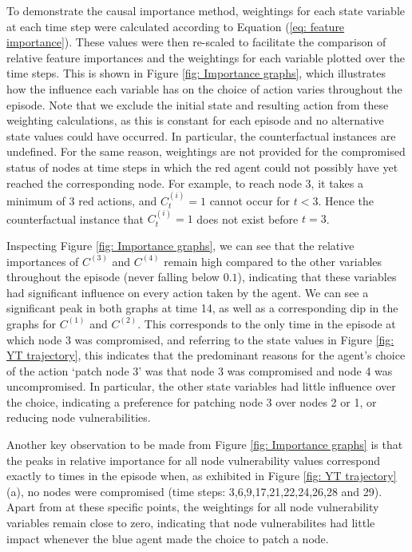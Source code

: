 \documentclass{article}
\begin{document}
To demonstrate the causal importance method, weightings for each state variable at each time step were calculated according to Equation (\ref{eq: feature importance}). 
These values were then re-scaled to facilitate the comparison of relative feature importances and the weightings for each variable plotted over the time steps. This is shown in Figure \ref{fig: Importance graphs}, which illustrates how the influence each variable has on the choice of action varies throughout the episode. Note that we exclude the initial state and resulting action from these weighting calculations, as this is constant for each episode and no alternative state values could have occurred. In particular, the counterfactual instances are undefined. For the same reason, weightings are not provided for the compromised status of nodes at time steps in which the red agent could not possibly have yet reached the corresponding node. For example, to reach node 3, it takes a minimum of 3 red actions, and $C^{(i)}_t = 1$ cannot occur for $t<3$. Hence the counterfactual instance that $C^{(i)}_t = 1$ does not exist before $t=3$. 

Inspecting Figure \ref{fig: Importance graphs}, we can see that the relative importances of $C^{(3)}$ and $C^{(4)}$ remain high compared to the other variables throughout the episode (never falling below $0.1$), indicating that these variables had significant influence on every action taken by the agent. We can see a significant peak in both graphs at time 14, as well as a corresponding dip in the graphs for $C^{(1)}$ and $C^{(2)}$. This corresponds to the only time in the episode at which node 3 was compromised, and referring to the state values in Figure \ref{fig: YT trajectory}, this indicates that the predominant reasons for the agent's choice of the action `patch node 3' was that node 3 was compromised and node 4 was uncompromised. In particular, the other state variables had little influence over the choice, indicating a preference for patching node 3 over nodes 2 or 1, or reducing node vulnerabilities. 

Another key observation to be made from Figure \ref{fig: Importance graphs} is that the peaks in relative importance for all node vulnerability values correspond exactly to times in the episode when, as exhibited in Figure \ref{fig: YT trajectory}(a), no nodes were compromised (time steps: 3,6,9,17,21,22,24,26,28 and 29). Apart from at these specific points, the weightings for all node vulnerability variables remain close to zero, indicating that node vulnerabilites had little impact whenever the blue agent made the choice to patch a node. 
\end{document}

